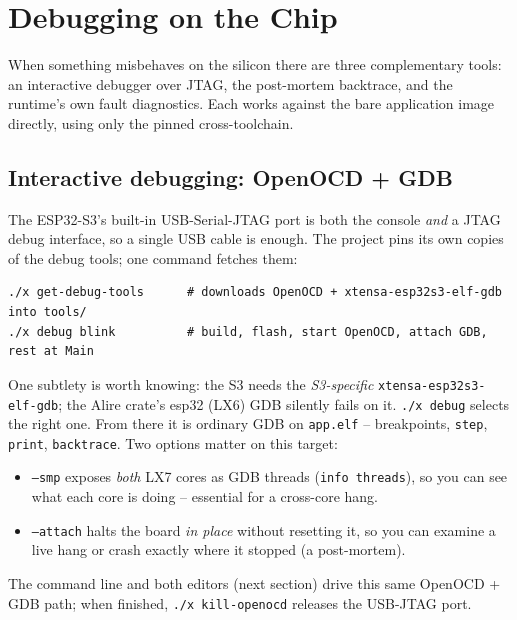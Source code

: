 \chapter{Debugging on the Chip}
\label{ch:debug}

When something misbehaves on the silicon there are three complementary tools: an
interactive debugger over JTAG, the post-mortem backtrace, and the runtime's own
fault diagnostics. Each works against the bare application image directly, using
only the pinned cross-toolchain.

\section{Interactive debugging: OpenOCD + GDB}

The ESP32-S3's built-in USB-Serial-JTAG port is both the console \emph{and} a JTAG
debug interface, so a single USB cable is enough. The project pins its own copies
of the debug tools; one command fetches them:

\begin{lstlisting}[style=sh]
./x get-debug-tools      # downloads OpenOCD + xtensa-esp32s3-elf-gdb into tools/
./x debug blink          # build, flash, start OpenOCD, attach GDB, rest at Main
\end{lstlisting}

One subtlety is worth knowing: the S3 needs the \emph{S3-specific}
\texttt{xtensa-esp32s3-elf-gdb}; the Alire crate's esp32 (LX6) GDB silently fails
on it. \texttt{./x debug} selects the right one. From there it is ordinary GDB on
\texttt{app.elf} -- breakpoints, \texttt{step}, \texttt{print},
\texttt{backtrace}. Two options matter on this target:

\begin{itemize}
  \item \texttt{--smp} exposes \emph{both} LX7 cores as GDB threads
        (\texttt{info threads}), so you can see what each core is doing --
        essential for a cross-core hang.
  \item \texttt{--attach} halts the board \emph{in place} without resetting it, so
        you can examine a live hang or crash exactly where it stopped (a
        post-mortem).
\end{itemize}

The command line and both editors (next section) drive this same OpenOCD + GDB
path; when finished, \texttt{./x kill-openocd} releases the USB-JTAG port.

